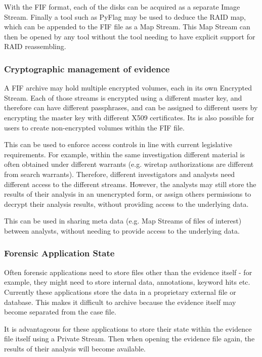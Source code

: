 \documentclass[10pt, conference]{IEEEtran}
\begin{document}
With the FIF format, each of the disks can be acquired as a separate
Image Stream. Finally a tool such as PyFlag may be used to deduce the
RAID map, which can be appended to the FIF file as a Map Stream. This
Map Stream can then be opened by any tool without the tool needing to
have explicit support for RAID reassembling.

\subsubsection{Cryptographic management of evidence}
A FIF archive may hold multiple encrypted volumes, each in its own
Encrypted Stream. Each of those streams is encrypted using a different
master key, and therefore can have different passphrases, and can be
assigned to different users by encrypting the master key with
different X509 certificates. Its is also possible for users to create
non-encrypted volumes within the FIF file.

This can be used to enforce access controls in line with current
legislative requirements. For example, within the same investigation
different material is often obtained under different warrants
(e.g. wiretap authorizations are different from search
warrants). Therefore, different investigators and analysts need
different access to the different streams. However, the analysts may
still store the results of their analysis in an unencrypted form, or
assign others permissions to decrypt their analysis results, without
providing access to the underlying data. 

This can be used in sharing meta data (e.g. Map Streams of files of
interest) between analysts, without needing to provide access to the
underlying data.

\subsubsection{Forensic Application State}
Often forensic applications need to store files other than the
evidence itself - for example, they might need to store internal data,
annotations, keyword hits etc. Currently these applications store the
data in a proprietary external file or database. This makes it
difficult to archive because the evidence itself may become separated
from the case file.

It is advantageous for these applications to store their state within
the evidence file itself using a Private Stream. Then when opening the
evidence file again, the results of their analysis will become
available.
\end{document}
